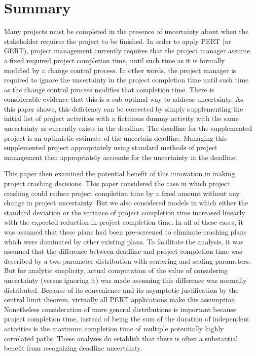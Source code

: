 \documentclass[11pt]{article}
\begin{document}
\section{Summary}
Many projects must be completed in the presence of uncertainty about when the stakeholder requires the project to be finished.    In order to apply PERT (or GERT), project management currently requires that the project manager assume a fixed required project completion time, until such time as it is formally modified by a change control process.   In other words, the project manager is required to ignore the uncertainty in the project completion time until such time as the change control process modifies that completion time.  There is considerable evidence that this is a sub-optimal way to address uncertainty.  As this paper shows, this deficiency can be corrected by simply supplementing the initial list of project activities with a fictitious dummy activity with the same uncertainty as currently exists in the deadline. The deadline for the supplemented project is an optimistic estimate of the uncertain deadline.  Managing this supplemented project appropriately using standard methods of project management then appropriately accounts for the uncertainty in the deadline.\par
This paper then examined the potential benefit of this innovation in making project crashing decisions. This paper considered the case in which project crashing could reduce project completion time by a fixed amount without any change in project uncertainty.  But we also considered models in which either the standard deviation or the variance of project completion time increased linearly with the expected reduction in project completion time.   In all of these cases, it was assumed that these plans had been pre-screened to eliminate crashing plans which were dominated by other existing plans.  To facilitate the analysis, it was assumed that the difference between deadline and project completion time was described by a two-parameter distribution with centering and scaling parameters.  But for analytic simplicity, actual computation of the value of considering uncertainty (versus ignoring it) was made assuming this difference was normally distributed.  Because of its convenience and its asymptotic justification by the central limit theorem, virtually all PERT applications make this assumption. Nonetheless consideration of more general distributions is important because project completion time, instead of being the sum of the duration of independent activities is the maximum completion time of multiple potentially highly correlated paths.  These analyses do establish that there is often a substantial benefit from recognizing deadline uncertainty.\par
\end{document}
